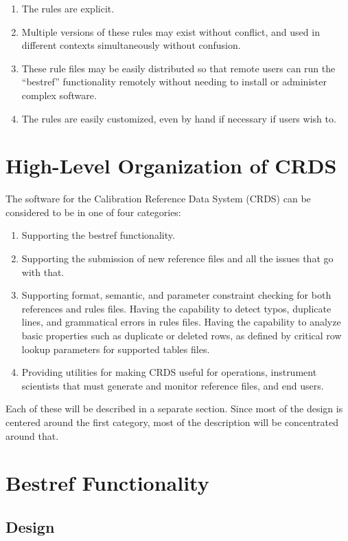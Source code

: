 \documentclass[final,authoryear,5p,times,twocolumn]{elsarticle}
\begin{document}
\begin{enumerate}
\item The rules are explicit.
\item Multiple versions of these rules may exist without conflict, and used in
different contexts simultaneously without confusion.
\item These rule files may be easily distributed so that remote users can run the
``bestref'' functionality remotely without needing to install or administer
complex software.
\item The rules are easily customized, even by hand if necessary if
users wish to.
\end{enumerate}

\section{High-Level Organization of CRDS}

The software for the Calibration Reference Data System (CRDS) 
can be considered to be in one of four categories:

\begin{enumerate}
\item Supporting the bestref functionality.
\item Supporting the submission of new reference files and all the issues that
go with that.
\item Supporting format, semantic, and parameter constraint checking for both
references and rules files.  Having the capability to detect typos, duplicate 
lines, and grammatical errors in rules files. 
Having the capability to analyze basic properties
such as duplicate or deleted rows, as defined by critical row lookup parameters 
for supported tables files.
\item Providing utilities for making CRDS useful for operations, instrument
scientists that must generate and monitor reference files, and end users.
\end{enumerate}

Each of these will be described in a separate section. Since most of the design
is centered around the first category, most of the description will be concentrated
around that.

\section{Bestref Functionality}

\subsection{Design}
\end{document}
